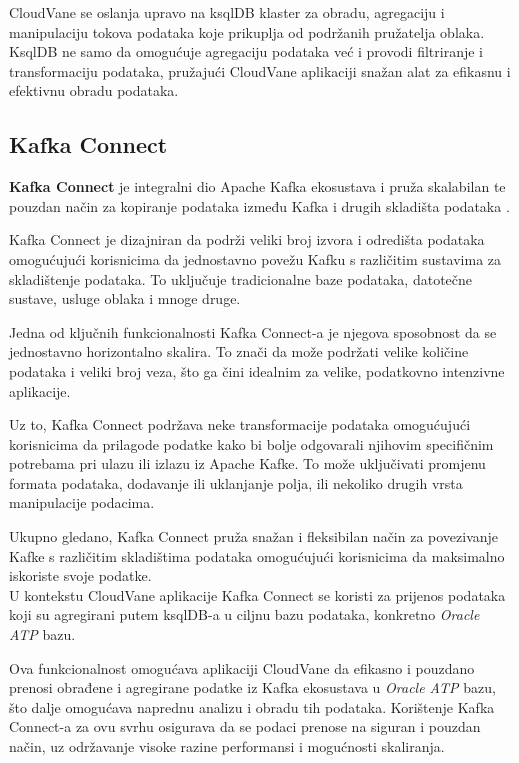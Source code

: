 \documentclass[times, utf8, diplomski]{fer}
\begin{document}
CloudVane se oslanja upravo na ksqlDB klaster za obradu, agregaciju i manipulaciju tokova podataka koje prikuplja od podržanih pružatelja oblaka. KsqlDB ne samo da omogućuje agregaciju podataka već i provodi filtriranje i transformaciju podataka, pružajući CloudVane aplikaciji snažan alat za efikasnu i efektivnu obradu podataka.


\subsection{Kafka Connect}
\label{sec:connect}

\textbf{Kafka Connect} je integralni dio Apache Kafka ekosustava i pruža skalabilan te pouzdan način za kopiranje podataka između Kafka i drugih skladišta podataka \citep{shapira_kafka_2021}.

Kafka Connect je dizajniran da podrži veliki broj izvora  i odredišta  podataka omogućujući korisnicima da jednostavno povežu Kafku s različitim sustavima za skladištenje podataka. To uključuje tradicionalne baze podataka, datotečne sustave, usluge oblaka i mnoge druge.

Jedna od ključnih funkcionalnosti Kafka Connect-a je njegova sposobnost da se jednostavno horizontalno skalira. To znači da može podržati velike količine podataka i veliki broj veza, što ga čini idealnim za velike, podatkovno intenzivne aplikacije.

Uz to, Kafka Connect podržava neke transformacije podataka omogućujući korisnicima da prilagode podatke kako bi bolje odgovarali njihovim specifičnim potrebama pri ulazu ili izlazu iz Apache Kafke. To može uključivati promjenu formata podataka, dodavanje ili uklanjanje polja, ili nekoliko drugih vrsta manipulacije podacima.

Ukupno gledano, Kafka Connect pruža snažan i fleksibilan način za povezivanje Kafke s različitim skladištima podataka omogućujući korisnicima da maksimalno iskoriste svoje podatke. \\

U kontekstu CloudVane aplikacije Kafka Connect se koristi za prijenos podataka koji su agregirani putem ksqlDB-a u ciljnu bazu podataka, konkretno \emph{Oracle ATP}  bazu.

Ova funkcionalnost omogućava aplikaciji CloudVane da efikasno i pouzdano prenosi obrađene i agregirane podatke iz Kafka ekosustava u \emph{Oracle ATP} bazu, što dalje omogućava naprednu analizu i obradu tih podataka. Korištenje Kafka Connect-a za ovu svrhu osigurava da se podaci prenose na siguran i pouzdan način, uz održavanje visoke razine performansi i mogućnosti skaliranja.
\end{document}
